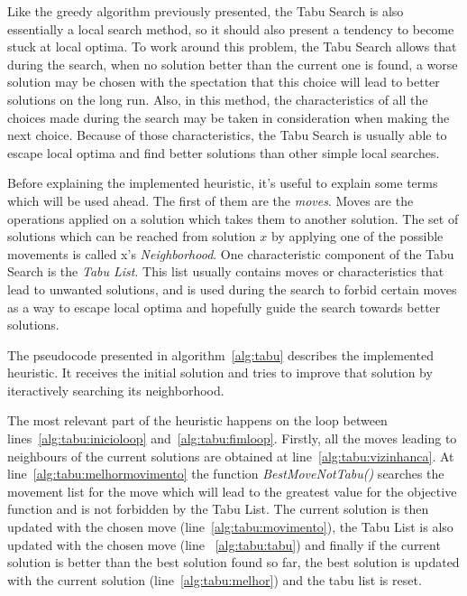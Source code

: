 Like the greedy algorithm previously presented, the Tabu Search is also essentially a local search method, so it should also present a tendency to 
become stuck at local optima. To work around this problem, the Tabu Search allows that during the search, when no solution better than the current one is found,
a worse solution may be chosen with the spectation that this choice will lead to better solutions on the long run. Also, in this method, the characteristics
of all the choices made during the search may be taken in consideration when making the next choice. Because of those characteristics, the Tabu Search is usually
able to escape local optima and find better solutions than other simple local searches.

Before explaining the implemented heuristic, it's useful to explain some terms which will be used ahead. The first of them are the 
\textit{moves}. Moves are the operations applied on a solution which takes them to another solution. The set of solutions which can be reached
from solution $x$ by applying one of the possible movements is called x's \textit{Neighborhood}. One characteristic component of the Tabu Search is the
\textit{Tabu List}. This list usually contains moves or characteristics that lead to unwanted solutions, and is used during the search to forbid certain moves
as a way to escape local optima and hopefully guide the search towards better solutions.

The pseudocode presented in algorithm~\ref{alg:tabu} describes the implemented heuristic. It receives the 
initial solution and tries to improve that solution by iteractively searching its neighborhood.



The most relevant part of the heuristic happens on the loop between lines~\ref{alg:tabu:inicioloop}
and~\ref{alg:tabu:fimloop}. Firstly, all the moves leading to neighbours of the current solutions are obtained at 
line~\ref{alg:tabu:vizinhanca}. At line~\ref{alg:tabu:melhormovimento} the function \textit{BestMoveNotTabu()} searches
the movement list for the move which will lead to the greatest value for the objective function and is not forbidden
by the Tabu List. The current solution is then updated with the chosen move (line~\ref{alg:tabu:movimento}), 
the Tabu List is also updated with the chosen move (line ~\ref{alg:tabu:tabu}) 
and finally if the current solution is better than the best solution found so far, the best solution is updated 
with the current solution (line~\ref{alg:tabu:melhor}) and the tabu list is reset.

